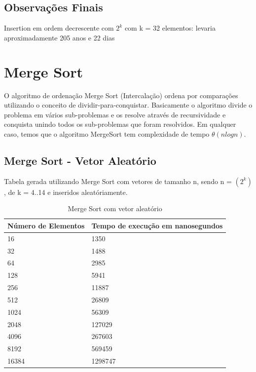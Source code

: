 \documentclass[12pt,a4paper,twoside]{report}
\begin{document}
\section{Observações Finais}
Insertion em ordem decrescente com $2^k$ com k = 32 elementos: levaria aproximadamente 205 anos e 22 dias 

\chapter{Merge Sort}
O algoritmo de ordenação Merge Sort (Intercalação) ordena por comparações utilizando o conceito de dividir-para-conquistar.
Basicamente o algoritmo divide o problema em vários sub-problemas e os resolve através de recursividade e conquista unindo todos os sub-problemas que foram resolvidos.
Em qualquer caso, temos que o algoritmo MergeSort tem complexidade de tempo $\theta(nlogn)$.

\section{Merge Sort - Vetor Aleatório}
Tabela gerada utilizando Merge Sort com vetores de tamanho n, sendo n = $(2^k)$, de k = 4..14 e inseridos aleatóriamente.
\begin{table}[H]
\centering
\caption{Merge Sort com vetor aleatório}
\label{my-label}
\begin{tabular}{|l|l|}
\hline
\multicolumn{1}{|c|}{\textbf{Número de Elementos}} & \multicolumn{1}{c|}{\textbf{Tempo de execução em nanosegundos}} \\ \hline
16 & 1350 \\ \hline
32 & 1488 \\ \hline
64 & 2985 \\ \hline
128 & 5941 \\ \hline
256 & 11887 \\ \hline
512 & 26809 \\ \hline
1024 & 56309 \\ \hline
2048 & 127029 \\ \hline
4096 & 267603 \\ \hline
8192 & 569459 \\ \hline
16384 & 1298747 \\ \hline
\end{tabular}
\end{table}
\end{document}
